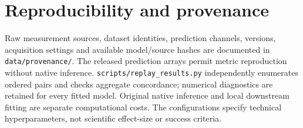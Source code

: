 \documentclass[pdflatex,sn-nature]{sn-jnl}
\begin{document}
\section*{Reproducibility and provenance}
Raw measurement sources, dataset identities, prediction channels, versions, acquisition settings and available model/source hashes are documented in \texttt{data/provenance/}. The released prediction arrays permit metric reproduction without native inference. \texttt{scripts/replay\_results.py} independently enumerates ordered pairs and checks aggregate concordance; numerical diagnostics are retained for every fitted model. Original native inference and local downstream fitting are separate computational costs. The configurations specify technical hyperparameters, not scientific effect-size or success criteria.
\end{document}
